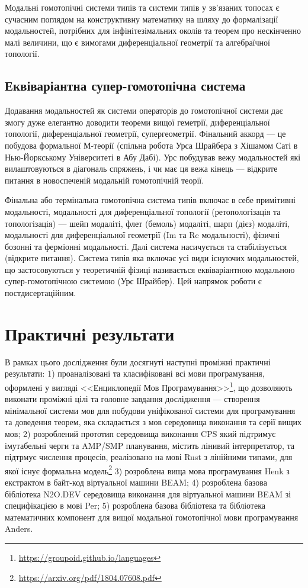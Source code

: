 Модальні гомотопічні системи типів та системи типів у зв'язаних топосах є сучасним поглядом на
конструктивну математику на шляху до формалізації модальностей, потрібних для інфінітезімальних околів та
теорем про нескінченно малі величини, що є вимогами диференціальної геометрії та алгебраїчної топології.

\subsection{Еквіваріантна супер-гомотопічна система}
Додавання модальностей як системи операторів до гомотопічної системи дає змогу дуже
елегантно доводити теореми вищої геметрії, диференціальної топології, диференціальної
геометрії, супергеометрії. Фінальний аккорд --- це побудова формальної М-теорії (спільна робота Урса Шрайбера
з Хішамом Саті в Нью-Йоркському Університеті в Абу Дабі). Урс побудував вежу модальностей які вилаштовуються
в діагональ спряжень, і чи має ця вежа кінець --- відкрите питання в новоспеченій модальній гомотопічній теорії.

Фінальна або термінальна гомотопічна система типів включає в себе примітивні модальності,
модальності для диференціальної топології (ретопологізація та топологізація) --- шейп модаліті,
флет (бемоль) модаліті, шарп (дієз) модаліті, модальності для диференціальної
геометрії (Im та Re модальності), фізичні бозонні та ферміонні модальності. Далі система
насичується та стабілізується (відкрите питання). Система типів яка включає
усі види існуючих модальностей, що застосовуються у теоретичній фізиці називається еквіваріантною
модальною супер-гомотопічною системою (Урс Шрайбер). Цей напрямок роботи є постдисертаційним.

\newpage
\section{Практичні результати}
В рамках цього дослідження були досягнуті наступні проміжні практичні результати:
1) проаналізовані та класифіковані всі мови програмування, оформлені у вигляді
   <<Енциклопедії Мов Програмування>>\footnote{\url{https://groupoid.github.io/languages}},
   що дозволяють виконати проміжні цілі та головне завдання дослідження --- створення
   мінімальної системи мов для побудови уніфікованої системи для програмування та доведення теорем,
   яка складається з мов середовища виконання та серії вищих мов;
2) розроблений прототип середовища виконання CPS який підтримує імутабельні черги
   та AMP/SMP планування, містить лінивий інтерпретатор, та підтрмує числення процесів,
   реалізовано на мові Rust з лінійними типами,
   для якої існує формальна модель\footnote{\url{https://arxiv.org/pdf/1804.07608.pdf}}
3) розроблена вища мова програмування Henk з екстрактом в байт-код віртуальної машини BEAM;
4) розроблена базова бібліотека N2O.DEV середовища виконання
   для віртуальної машини BEAM зі специфікацією в мові Per;
5) розроблена базова бібліотека та бібліотека математичних компонент для вищої модальної
   гомотопічної мови програмування Anders.

